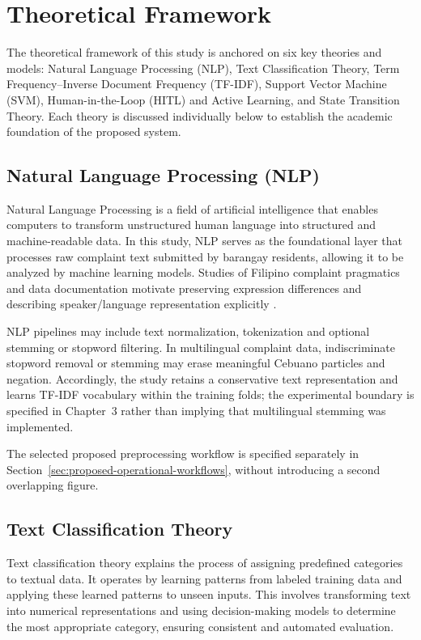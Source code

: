 \section{Theoretical Framework}
The theoretical framework of this study is anchored on six key theories and models: Natural Language Processing (NLP), Text Classification Theory, Term Frequency--Inverse Document Frequency (TF-IDF), Support Vector Machine (SVM), Human-in-the-Loop (HITL) and Active Learning, and State Transition Theory. Each theory is discussed individually below to establish the academic foundation of the proposed system.

\subsection{Natural Language Processing (NLP)}
Natural Language Processing is a field of artificial intelligence that enables computers to transform unstructured human language into structured and machine-readable data. In this study, NLP serves as the foundational layer that processes raw complaint text submitted by barangay residents, allowing it to be analyzed by machine learning models. Studies of Filipino complaint pragmatics and data documentation motivate preserving expression differences and describing speaker/language representation explicitly \cite{deleon,benderfriedman}.

NLP pipelines may include text normalization, tokenization and optional stemming or stopword filtering. In multilingual complaint data, indiscriminate stopword removal or stemming may erase meaningful Cebuano particles and negation. Accordingly, the study retains a conservative text representation and learns TF-IDF vocabulary within the training folds; the experimental boundary is specified in Chapter~3 rather than implying that multilingual stemming was implemented.

The selected proposed preprocessing workflow is specified separately in Section~\ref{sec:proposed-operational-workflows}, without introducing a second overlapping figure.

\subsection{Text Classification Theory}
Text classification theory explains the process of assigning predefined categories to textual data. It operates by learning patterns from labeled training data and applying these learned patterns to unseen inputs. This involves transforming text into numerical representations and using decision-making models to determine the most appropriate category, ensuring consistent and automated evaluation.

